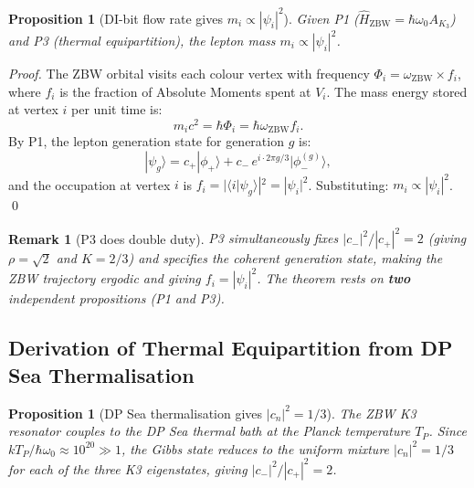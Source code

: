 \documentclass[11pt]{article}
\newtheorem{remark}{Remark}[section]
\newtheorem{proposition}[theorem]{Proposition}
\newcommand{\ZBW}{\mathrm{ZBW}}
\begin{document}
\begin{proposition}[DI-bit flow rate gives $m_i \propto |\psi_i|^2$]
Given P1 ($\hat{H}_\ZBW = \hbar\omega_0 A_{K_3}$) and P3 (thermal
equipartition), the lepton mass $m_i \propto |\psi_i|^2$.
\end{proposition}

\begin{proof}
The ZBW orbital visits each colour vertex with frequency
$\Phi_i = \omega_{\ZBW} \times f_i$, where $f_i$ is the fraction of
Absolute Moments spent at $V_i$.  The mass energy stored at vertex $i$
per unit time is:
\begin{equation}
m_i c^2 = \hbar \Phi_i = \hbar\omega_{\ZBW} f_i.
\label{eq:mass_rate}
\end{equation}
By P1, the lepton generation state for generation $g$ is:
\begin{equation}
|\psi_g\rangle = c_+|\phi_+\rangle
+ c_-\, e^{i\cdot 2\pi g/3}|\phi_-^{(g)}\rangle,
\end{equation}
and the occupation at vertex $i$ is $f_i = |\langle i|\psi_g\rangle|^2 = |\psi_i|^2$.
Substituting: $m_i \propto |\psi_i|^2$. \qed
\end{proof}

\begin{remark}[P3 does double duty]
P3 simultaneously fixes $|c_-|^2/|c_+|^2 = 2$ (giving $\rho = \sqrt{2}$
and $K = 2/3$) and specifies the coherent generation state, making the
ZBW trajectory ergodic and giving $f_i = |\psi_i|^2$.
The theorem rests on \textbf{two} independent propositions (P1 and P3).
\end{remark}

\subsection*{Derivation of Thermal Equipartition from DP Sea Thermalisation}
\label{prop:P3_derivation}

\begin{proposition}[DP Sea thermalisation gives $|c_n|^2 = 1/3$]
\label{prop:equip_derived}
The ZBW K3 resonator couples to the DP Sea thermal bath at the Planck
temperature $T_P$.  Since $kT_P/\hbar\omega_0 \approx 10^{20} \gg 1$,
the Gibbs state reduces to the uniform mixture $|c_n|^2 = 1/3$
for each of the three K3 eigenstates, giving $|c_-|^2/|c_+|^2 = 2$.
\end{proposition}
\end{document}
